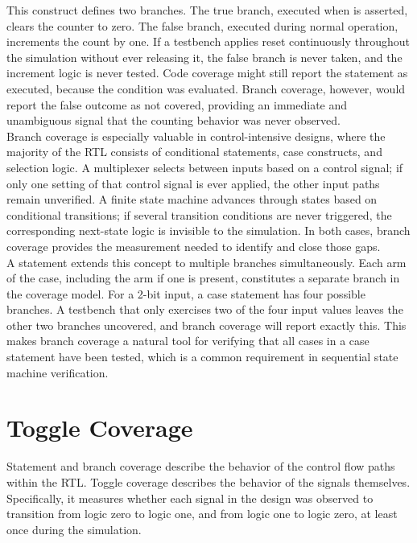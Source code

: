 This construct defines two branches. The true branch, executed when  is asserted, clears the counter to zero. The false branch, executed during normal operation, increments the count by one. If a testbench applies reset continuously throughout the simulation without ever releasing it, the false branch is never taken, and the increment logic is never tested. Code coverage might still report the  statement as executed, because the condition was evaluated. Branch coverage, however, would report the false outcome as not covered, providing an immediate and unambiguous signal that the counting behavior was never observed.\\

Branch coverage is especially valuable in control-intensive designs, where the majority of the RTL consists of conditional statements, case constructs, and selection logic. A multiplexer selects between inputs based on a control signal; if only one setting of that control signal is ever applied, the other input paths remain unverified. A finite state machine advances through states based on conditional transitions; if several transition conditions are never triggered, the corresponding next-state logic is invisible to the simulation. In both cases, branch coverage provides the measurement needed to identify and close those gaps.\\

A  statement extends this concept to multiple branches simultaneously. Each arm of the case, including the  arm if one is present, constitutes a separate branch in the coverage model. For a 2-bit input, a case statement has four possible branches. A testbench that only exercises two of the four input values leaves the other two branches uncovered, and branch coverage will report exactly this. This makes branch coverage a natural tool for verifying that all cases in a case statement have been tested, which is a common requirement in sequential state machine verification.\\

\section{Toggle Coverage}
\label{sec:toggle-coverage}

Statement and branch coverage describe the behavior of the control flow paths within the RTL. Toggle coverage describes the behavior of the signals themselves. Specifically, it measures whether each signal in the design was observed to transition from logic zero to logic one, and from logic one to logic zero, at least once during the simulation.\\

